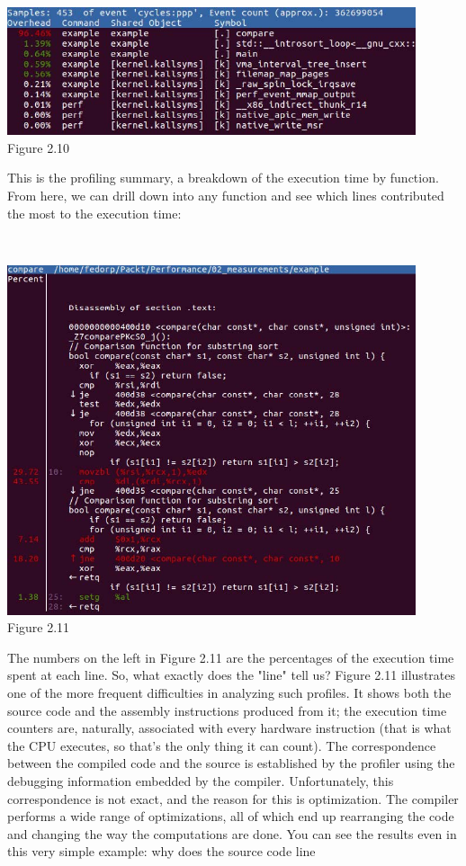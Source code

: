 \hspace*{\fill} \\ %
\begin{center}
\includegraphics[width=0.9\textwidth]{content/1/chapter2/images/10.jpg}\\
Figure 2.10
\end{center}

This is the profiling summary, a breakdown of the execution time by function. From here, we can drill down into any function and see which lines contributed the most to the execution time:

\hspace*{\fill} \\ %
\begin{center}
\includegraphics[width=0.9\textwidth]{content/1/chapter2/images/11.jpg}\\
Figure 2.11
\end{center}

The numbers on the left in Figure 2.11 are the percentages of the execution time spent at each line. So, what exactly does the "line" tell us? Figure 2.11 illustrates one of the more frequent difficulties in analyzing such profiles. It shows both the source code and the assembly instructions produced from it; the execution time counters are, naturally, associated with every hardware instruction (that is what the CPU executes, so that's the only thing it can count). The correspondence between the compiled code and the source is established by the profiler using the debugging information embedded by the compiler. Unfortunately, this correspondence is not exact, and the reason for this is optimization. The compiler performs a wide range of optimizations, all of which end up rearranging the code and changing the way the computations are done. You can see the results even in this very simple example: why does the source code line

